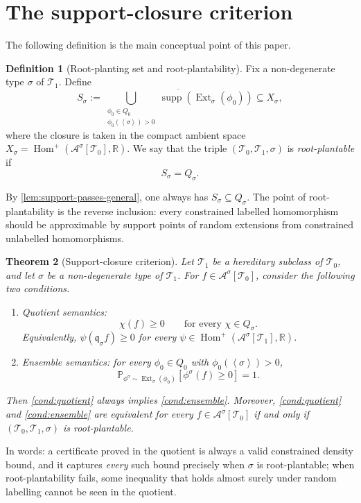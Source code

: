 \documentclass[11pt]{article}
\newtheorem{theorem}{Theorem}
\theoremstyle{definition}
\newtheorem{definition}[theorem]{Definition}
\newcommand{\R}{\mathbb{R}}
\newcommand{\Prob}{\mathbb{P}}
\newcommand{\A}{\mathcal{A}}
\newcommand{\T}{\mathcal{T}}
\newcommand{\Homp}{\operatorname{Hom}^{+}}
\newcommand{\Ext}{\operatorname{Ext}}
\newcommand{\supp}{\operatorname{supp}}
\newcommand{\brak}[1]{\left\langle #1\right\rangle}
\newcommand{\qmap}{\mathfrak q}
\begin{document}
\section{The support-closure criterion}

The following definition is the main conceptual point of this paper.

\begin{definition}[Root-planting set and root-plantability]\label{def:root-planting}
Fix a non-degenerate type $\sigma$ of $\T_1$.  Define
\[
  S_\sigma
  :=
  \overline{
  \bigcup_{\substack{\phi_0\in Q_0\\ \phi_0(\brak\sigma)>0}}
  \supp(\Ext_\sigma(\phi_0))}
  \subseteq X_\sigma,
\]
where the closure is taken in the compact ambient space
$X_\sigma=\Homp(\A^\sigma[\T_0],\R)$.
We say that the triple $(\T_0,\T_1,\sigma)$ is \emph{root-plantable} if
\[
  S_\sigma=Q_\sigma.
\]
\end{definition}

By \cref{lem:support-passes-general}, one always has $S_\sigma\subseteq Q_\sigma$.
The point of root-plantability is the reverse inclusion: every constrained
labelled homomorphism should be approximable by support points of random
extensions from constrained unlabelled homomorphisms.

\begin{theorem}[Support-closure criterion]\label{thm:support-criterion}
Let $\T_1$ be a hereditary subclass of $\T_0$, and let $\sigma$ be a non-degenerate type of $\T_1$.  For $f\in\A^\sigma[\T_0]$, consider the following two
conditions.
\begin{enumerate}[label=\textup{(\alph*)}, leftmargin=2.8em]
  \item\label{cond:quotient}
  Quotient semantics:
  \[
    \chi(f)\ge0\qquad\text{for every }\chi\in Q_\sigma.
  \]
  Equivalently, $\psi(\qmap_\sigma f)\ge0$ for every
  $\psi\in\Homp(\A^\sigma[\T_1],\R)$.
  \item\label{cond:ensemble}
  Ensemble semantics:
  for every $\phi_0\in Q_0$ with $\phi_0(\brak\sigma)>0$,
  \[
    \Prob_{\phi^\sigma\sim\Ext_\sigma(\phi_0)}[\phi^\sigma(f)\ge0]=1.
  \]
\end{enumerate}
Then \ref{cond:quotient} always implies \ref{cond:ensemble}.  Moreover,
\ref{cond:quotient} and \ref{cond:ensemble} are equivalent for every
$f\in\A^\sigma[\T_0]$ if and only if $(\T_0,\T_1,\sigma)$ is root-plantable.
\end{theorem}

In words: a certificate proved in the quotient is always a valid constrained density
bound, and it captures \emph{every} such bound precisely when $\sigma$ is
root-plantable; when root-plantability fails, some inequality that holds almost surely
under random labelling cannot be seen in the quotient.
\end{document}
